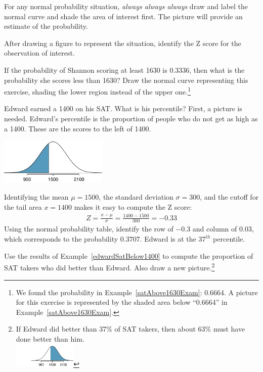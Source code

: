 \begin{tipBox}{
For any normal probability situation, \emph{always always always} draw and label the normal curve and shade the area of interest first. The picture will provide an estimate of the probability. \vspace{3mm}

After drawing a figure to represent the situation, identify the Z score for the observation of interest.\vspace{1mm}}
\end{tipBox}

\begin{exercise}
If the probability of Shannon scoring at least 1630 is 0.3336, then what is the probability she scores less than 1630? Draw the normal curve representing this exercise, shading the lower region instead of the upper one.\footnote{We found the probability in Example~\ref{satAbove1630Exam}: 0.6664. A picture for this exercise is represented by the shaded area below ``0.6664'' in Example~\ref{satAbove1630Exam}.}
\end{exercise}

\begin{example}{Edward earned a 1400 on his SAT. What is his percentile?} \label{edwardSatBelow1400}
First, a picture is needed. Edward's percentile is the proportion of people who do not get as high as a 1400. These are the scores to the left of 1400.
\begin{center}
\includegraphics[height=22mm]{02/figures/satBelow1400/satBelow1400}
\end{center}
Identifying the mean $\mu=1500$, the standard deviation $\sigma=300$, and the cutoff for the tail area $x=1400$ makes it easy to compute the Z score:
\begin{eqnarray*}
Z = \frac{x - \mu}{\sigma} = \frac{1400 - 1500}{300} = -0.33
\end{eqnarray*}
Using the normal probability table, identify the row of $-0.3$ and column of $0.03$, which corresponds to the probability $0.3707$. Edward is at the $37^{th}$ percentile.
\end{example}

\begin{exercise}
Use the results of Example~\ref{edwardSatBelow1400} to compute the proportion of SAT takers who did better than Edward. Also draw a new picture.\footnote{If Edward did better than 37\% of SAT takers, then about 63\% must have done better than him. \\
\includegraphics[height=12mm]{02/figures/satBelow1400/satAbove1400}}
\end{exercise}

